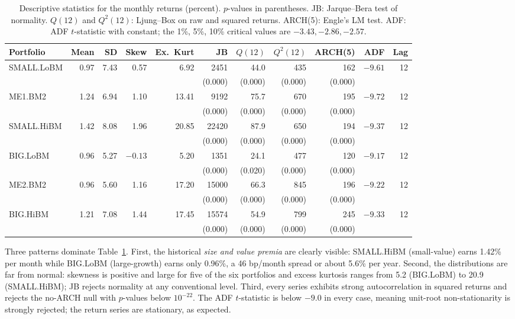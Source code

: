\documentclass[11pt,a4paper]{article}
\begin{document}
\begin{table}[h!]
\centering
\caption{Descriptive statistics for the monthly returns (percent). $p$-values in parentheses. JB: Jarque--Bera test of normality. $Q(12)$ and $Q^2(12)$: Ljung--Box on raw and squared returns. ARCH(5): Engle's LM test. ADF: ADF $t$-statistic with constant; the 1\%, 5\%, 10\% critical values are $-3.43, -2.86, -2.57$.}
\label{tab:descriptive}
\small
\begin{tabular}{lrrrrrrrrrr}
\toprule
Portfolio & Mean & SD & Skew & Ex.\ Kurt & JB & $Q(12)$ & $Q^2(12)$ & ARCH(5) & ADF & Lag \\
\midrule
SMALL.LoBM & 0.97 & 7.43 & 0.57 & 6.92 & 2451 & 44.0 & 435 & 162 & $-9.61$ & 12 \\
           &      &      &      &      & (0.000) & (0.000) & (0.000) & (0.000) & & \\
ME1.BM2    & 1.24 & 6.94 & 1.10 & 13.41 & 9192 & 75.7 & 670 & 195 & $-9.72$ & 12 \\
           &      &      &      &      & (0.000) & (0.000) & (0.000) & (0.000) & & \\
SMALL.HiBM & 1.42 & 8.08 & 1.96 & 20.85 & 22420 & 87.9 & 650 & 194 & $-9.37$ & 12 \\
           &      &      &      &      & (0.000) & (0.000) & (0.000) & (0.000) & & \\
BIG.LoBM   & 0.96 & 5.27 & $-0.13$ & 5.20 & 1351 & 24.1 & 477 & 120 & $-9.17$ & 12 \\
           &      &      &      &      & (0.000) & (0.020) & (0.000) & (0.000) & & \\
ME2.BM2    & 0.96 & 5.60 & 1.16 & 17.20 & 15000 & 66.3 & 845 & 196 & $-9.22$ & 12 \\
           &      &      &      &      & (0.000) & (0.000) & (0.000) & (0.000) & & \\
BIG.HiBM   & 1.21 & 7.08 & 1.44 & 17.45 & 15574 & 54.9 & 799 & 245 & $-9.33$ & 12 \\
           &      &      &      &      & (0.000) & (0.000) & (0.000) & (0.000) & & \\
\bottomrule
\end{tabular}
\end{table}

Three patterns dominate Table~\ref{tab:descriptive}. First, the historical \emph{size and value premia} are clearly visible: SMALL.HiBM (small-value) earns 1.42\% per month while BIG.LoBM (large-growth) earns only 0.96\%, a 46 bp/month spread or about 5.6\% per year. Second, the distributions are far from normal: skewness is positive and large for five of the six portfolios and excess kurtosis ranges from 5.2 (BIG.LoBM) to 20.9 (SMALL.HiBM); JB rejects normality at any conventional level. Third, every series exhibits strong autocorrelation in squared returns and rejects the no-ARCH null with $p$-values below $10^{-22}$. The ADF $t$-statistic is below $-9.0$ in every case, meaning unit-root non-stationarity is strongly rejected; the return series are stationary, as expected.
\end{document}

